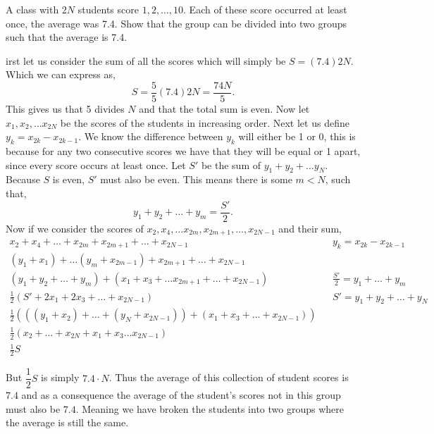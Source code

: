 \documentclass[11pt]{article}
\newenvironment{problem}[2][Problem\!]{\begin{trivlist}
\item[\hskip \labelsep {\bfseries #1}\hskip \labelsep {\bfseries #2}]}{\end{trivlist}}
\begin{document}
\begin{tcolorbox}
    \begin{problem} {OC | 11/24 | PP21}
        A class with $2N$ students score $1,2, \dots, 10$. Each of these score occurred at least once, the average was 7.4. Show that the group can be divided into two groups such that the average is 7.4.
    \end{problem}
\end{tcolorbox}
\begin{problem}
    First let us consider the sum of all the scores which will simply be $S = (7.4)2N$. Which we can express as,
    \[S = \frac{5}{5}(7.4)2N = \frac{74N}{5}.\]
    This gives us that 5 divides $N$ and that the total sum is even. Now let $x_1, x_2, \dots x_{2N}$ be the scores of the students in increasing order. Next let us define $y_k = x_{2k} - x_{2k -1}$. We know the difference between $y_k$ will either be 1 or 0, this is because for any two consecutive scores we have that they will be equal or 1 apart, since every score occurs at least once. Let $S'$ be the sum of $y_1 + y_2 + \dots y_N$. Because $S$ is even, $S'$ must also be even. This means there is some $m < N$, such that,
    \[y_1 + y_2 + \dots + y_m = \frac{S'}{2}.\]
    Now if we consider the scores of $x_2,x_4, \dots x_{2m}, x_{2m+1} , \dots,  x_{2N -1 } $ and their sum,
    \begin{align*}
        x_2 + x_4 + \dots + x_{2m} + x_{2m + 1} + \dots + x_{2N - 1} && y_k = x_{2k} - x_{2k -1} \\
        (y_1 + x_1 ) + \dots (y_m + x_{2m - 1}) + x_{2m + 1} + \dots + x_{2N-1} \\
        (y_1 + y_2 + \dots + y_m) + (x_1 + x_3 + \dots x_{2m+1} + \dots + x_{2N-1}) && \frac{S'}{2} = y_1 + \dots + y_m \\
        \frac{1}{2}(S' + 2x_1 + 2x_3 + \dots + x_{2N-1}) && S' = y_1 + y_2 + \dots + y_N \\
        \frac{1}{2} (((y_1 + x_2) +  \dots + (y_N + x_{2N - 1})) + (x_1 + x_3 + \dots + x_{2N-1})) \\
        \frac{1}{2} (x_2 + \dots + x_{2N} + x_1 + x_3 \dots x_{2N-1}) \\
        \frac{1}{2} S
    \end{align*}

    But $\dfrac{1}{2}S$ is simply $7.4 \cdot N$. Thus the average of this collection of student scores is $7.4$ and as a consequence the average of the student's scores not in this group must also be $7.4$. Meaning we have broken the students into two groups where the average is still the same. 
\end{problem}
\end{document}
